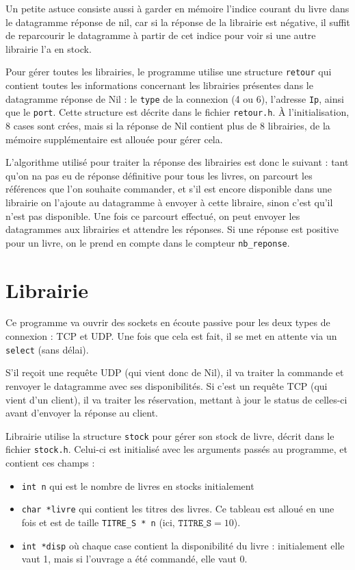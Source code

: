 \documentclass[10pt,a4paper]{article}
\renewcommand{\ss}{\vspace{\baselineskip}}
\begin{document}
\begin{multicols}{2}
Un petite astuce consiste aussi à garder en mémoire l'indice courant du livre dans le datagramme réponse de nil, car si la réponse de la librairie est négative, il suffit de reparcourir le datagramme à partir de cet indice pour voir si une autre librairie l'a en stock.

\ss

Pour gérer toutes les librairies, le programme utilise une structure \texttt{retour} qui contient toutes les informations concernant les librairies présentes dans le datagramme réponse de Nil : le \texttt{type} de la connexion (4 ou 6), l'adresse \texttt{Ip}, ainsi que le \texttt{port}. Cette structure est décrite dans le fichier \texttt{retour.h}.
À l'initialisation, 8 cases sont crées, mais si la réponse de Nil contient plus de 8 librairies, de la mémoire supplémentaire est allouée pour gérer cela.

\ss

L'algorithme utilisé pour traiter la réponse des librairies est donc le suivant : tant qu'on na pas eu de réponse définitive pour tous les livres, on parcourt les références que l'on souhaite commander, et s'il est encore disponible dans une librairie on l'ajoute au datagramme à envoyer à cette libraire, sinon c'est qu'il n'est pas disponible. Une fois ce parcourt effectué, on peut envoyer les datagrammes aux librairies et attendre les réponses. Si une réponse est positive pour un livre, on le prend en compte dans le compteur \texttt{nb\_reponse}.





\section{Librairie}

Ce programme va ouvrir des sockets en écoute passive pour les deux types de connexion : TCP et UDP. Une fois que cela est fait, il se met en attente via un \texttt{select} (sans délai).

S'il reçoit une requête UDP (qui vient donc de Nil), il va traiter la commande et renvoyer le datagramme avec ses disponibilités. Si c'est un requête TCP (qui vient d'un client), il va traiter les réservation, mettant à jour le status de celles-ci avant d'envoyer la réponse au client.

\ss

Librairie utilise la structure \texttt{stock} pour gérer son stock de livre, décrit dans le fichier \texttt{stock.h}. Celui-ci est initialisé avec les arguments passés au programme, et contient ces champs :
\begin{itemize}
	\item \texttt{int n} qui est le nombre de livres en stocks initialement
	\item \texttt{char *livre} qui contient les titres des livres. Ce tableau est alloué en une fois et est de taille \texttt{TITRE\_S * n} (ici, $\texttt{TITRE\_S}=10$).
	\item \texttt{int *disp} où chaque case contient la disponibilité du livre : initialement elle vaut 1, mais si l'ouvrage a été commandé, elle vaut 0.
\end{itemize}




\end{multicols}
\end{document}
